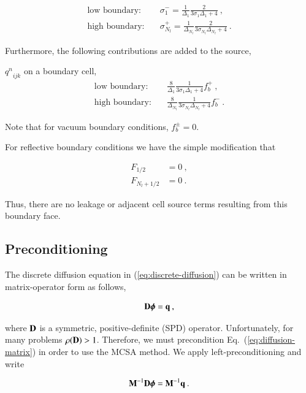 \documentclass[preprint,12pt]{elsarticle}
\newcommand{\qn}{\ensuremath{q^n}}
\newcommand{\bphi}{\ensuremath{\boldsymbol{\phi}}}
\begin{document}
\begin{align}
  \text{low boundary:}\quad & \sigma_1^{-} = \frac{1}{\Delta_1}
  \frac{2}{3\sigma_1\Delta_1 + 4}\:,\\
  \text{high boundary:}\quad & \sigma_{N_l}^{+} = \frac{1}{\Delta_{N_l}}
  \frac{2}{3\sigma_{N_l}\Delta_{N_l} + 4}\:.
\end{align}

Furthermore, the following contributions are added to the source,

$\qn_{ijk}$ on a boundary cell,
\begin{align}
  \text{low boundary:}\quad & \frac{8}{\Delta_1}
  \frac{1}{3\sigma_1\Delta_1 + 4}f_b^{+}\:,\\
  \text{high boundary:}\quad & \frac{8}{\Delta_{N_l}}
  \frac{1}{3\sigma_{N_l}\Delta_{N_l} + 4}f_b^{-}\:.
\end{align}

Note that for vacuum boundary conditions, $f_b^{\pm} = 0$.

For reflective boundary conditions we have the simple modification
that

\begin{align}
  F_{1/2} &= 0\:, \\
  F_{N_l+1/2} &= 0\:.
\end{align}

Thus, there are no leakage or adjacent cell source terms resulting
from this boundary face.

\subsection{Preconditioning}
\label{sec:preconditioning}

The discrete diffusion equation in (\ref{eq:discrete-diffusion}) can
be written in matrix-operator form as follows,

\begin{equation}
  \ve{D}\bphi = \ve{q}\:,
  \label{eq:diffusion-matrix}
\end{equation}

where $\mathbf{D}$ is a symmetric, positive-definite (SPD) operator.
Unfortunately, for many problems $\rho(\mathbf{D}) > 1$.  Therefore, we
must precondition Eq.~(\ref{eq:diffusion-matrix}) in order to use the
MCSA method. We apply left-preconditioning and write

\begin{equation}
  \ve{M}^{-1}\ve{D}\bphi = \ve{M}^{-1}\ve{q}\:.
  \label{eq:preconditioned-diffusion}
\end{equation}
\end{document}
